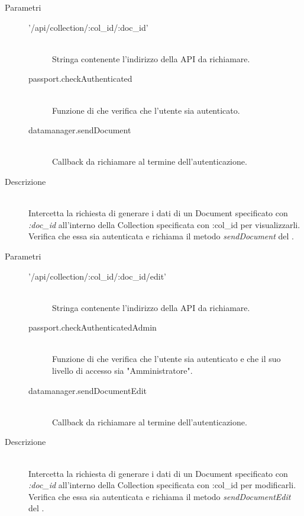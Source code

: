 \begin{description}
\begin{description}
\begin{mldescription}
   \hfill 
  \begin{description}
   \item[Parametri] \hfill 
    \begin{description}
     \item['/api/collection/:col\_id/:doc\_id'] \hfill \\
     Stringa contenente l'indirizzo della API da richiamare.
     \item[passport.checkAuthenticated] \hfill \\
     Funzione di  che verifica che l'utente sia autenticato.
     \item[datamanager.sendDocument] \hfill \\
     Callback da richiamare al termine dell'autenticazione.
     \end{description}
   \item[Descrizione] \hfill \\ 
  Intercetta la richiesta di generare i dati di un Document specificato con \textit{:doc\_id} all'interno della Collection specificata con :col\_id per visualizzarli. Verifica che essa sia autenticata e richiama il metodo \textit{sendDocument} del .
  \end{description}
  
   \hfill 
  \begin{description}
   \item[Parametri] \hfill 
    \begin{description}
     \item['/api/collection/:col\_id/:doc\_id/edit'] \hfill \\
     Stringa contenente l'indirizzo della API da richiamare.
     \item[passport.checkAuthenticatedAdmin] \hfill \\
     Funzione di  che verifica che l'utente sia autenticato e che il suo livello di accesso sia "Amministratore".
     \item[datamanager.sendDocumentEdit] \hfill \\
     Callback da richiamare al termine dell'autenticazione.
     \end{description}
   \item[Descrizione] \hfill \\ 
  Intercetta la richiesta di generare i dati di un Document specificato con \textit{:doc\_id} all'interno della Collection specificata con :col\_id per modificarli. Verifica che essa sia autenticata e richiama il metodo \textit{sendDocumentEdit} del .
  \end{description}
  

\end{mldescription}
\end{description}
\end{description}
